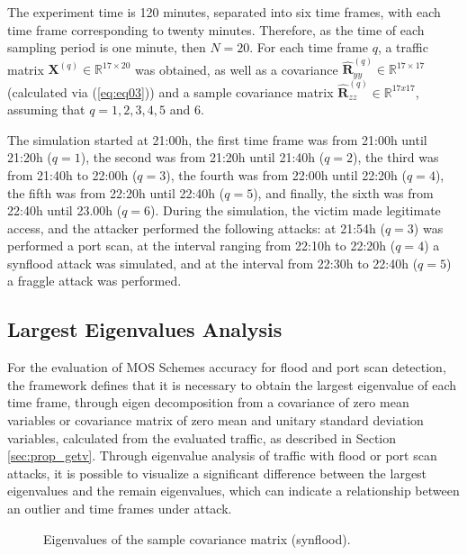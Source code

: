 \documentclass[review]{elsarticle}
\begin{document}
The experiment time is 120 minutes, separated into six time frames, with each time frame corresponding to twenty minutes. Therefore, as the time of each sampling period is one minute, then $N = 20$. For each time frame $q$, a traffic matrix $\boldsymbol{X}^{(q)} \in \mathbb{R}^{17 \times 20}$ was obtained, as well as a covariance $\boldsymbol{\hat{R}}_{yy}^{(q)} \in \mathbb{R}^{17 \times 17}$ (calculated via (\ref{eq:eq03})) and a sample covariance matrix $\boldsymbol{\hat{R}}_{zz}^{(q)} \in \mathbb{R}^{17x17}$, assuming that $q = 1, 2, 3, 4, 5$ and $6$. 

The simulation started at 21:00h, the first time frame was from 21:00h until 21:20h ($q = 1$), the second was from 21:20h until 21:40h ($q = 2$), the third was from 21:40h to 22:00h ($q = 3$), the fourth was from 22:00h until 22:20h ($q = 4$), the fifth was from 22:20h until 22:40h ($q = 5$), and finally, the sixth was from 22:40h until 23.00h ($q = 6$). During the simulation, the victim made legitimate access, and the attacker performed the following attacks: at 21:54h ($q = 3$) was performed a port scan, at the interval ranging from 22:10h to 22:20h ($q = 4$) a synflood attack was simulated, and at the interval from 22:30h to 22:40h ($q = 5$) a fraggle attack was performed.

\subsection{Largest Eigenvalues Analysis}
\label{sec:largesteigenvaluesanalysis}

For the evaluation of MOS Schemes accuracy for flood and port scan detection, the framework defines that it is necessary to obtain the largest eigenvalue of each time frame, through eigen decomposition from a covariance of zero mean variables or covariance matrix of zero mean and unitary standard deviation variables, calculated from the evaluated traffic, as described in Section \ref{sec:prop_getv}. Through eigenvalue analysis of traffic with flood or port scan attacks, it is possible to visualize a significant difference between the largest eigenvalues and the remain eigenvalues, which can indicate a relationship between an outlier and time frames under attack.

\begin{figure}[h!]
	\centering
     \caption{Eigenvalues of the sample covariance matrix (synflood).}
     \label{fig:fig10}
\end{figure}
\end{document}
